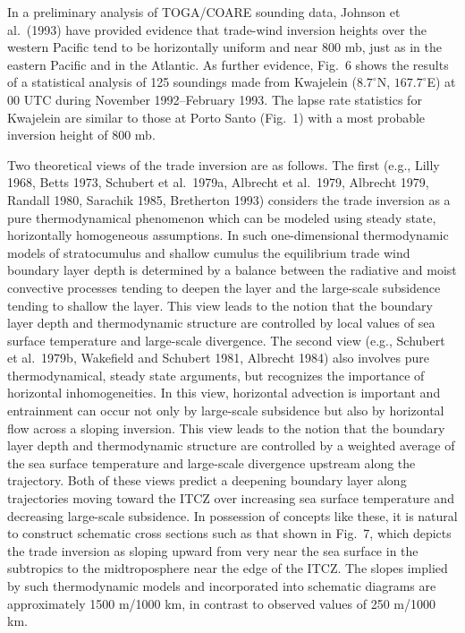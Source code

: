     In a preliminary analysis of TOGA/COARE sounding data, Johnson et
al.~(1993) have provided evidence that trade-wind inversion heights over the
western Pacific tend to be horizontally uniform and near 800 mb, just as in
the eastern Pacific and in the Atlantic.  As further evidence, Fig.~6 shows
the results of a statistical analysis of 125 soundings made from Kwajelein
($8.7^\circ$N, $167.7^\circ$E) at 00 UTC during November 1992--February 1993. 
The lapse rate statistics for Kwajelein are similar to those at Porto Santo
(Fig.~1) with a most probable inversion height of 800 mb.

     Two theoretical views of the trade inversion are as follows.  The first
(e.g., Lilly 1968, Betts 1973, Schubert et al.~1979a, Albrecht et al.\ 1979,
Albrecht 1979, Randall 1980, Sarachik 1985, Bretherton 1993) considers the
trade inversion as a pure thermodynamical phenomenon which can be modeled
using steady state, horizontally homogeneous assumptions. In such
one-dimensional thermodynamic models of stratocumulus and shallow cumulus the
equilibrium trade wind boundary layer depth is determined by a balance between
the radiative and moist convective processes tending to deepen the layer and
the large-scale subsidence tending to shallow the layer. This view leads to
the notion that the boundary layer depth and thermodynamic structure are
controlled by local values of sea surface temperature and large-scale
divergence.  The second view (e.g.,
Schubert et al.~1979b, Wakefield and Schubert 1981, Albrecht 1984) also
involves pure thermodynamical, steady state arguments, but recognizes the
importance of horizontal inhomogeneities.  In this view, horizontal advection
is important and entrainment can occur not only by large-scale subsidence but
also by horizontal flow across a sloping inversion.  This view leads to the
notion that the boundary layer depth and thermodynamic structure are
controlled by a weighted average of the sea surface temperature and
large-scale divergence upstream along the trajectory.  Both of these views 
predict a deepening boundary layer along trajectories moving toward the ITCZ
over increasing sea surface temperature and decreasing large-scale subsidence.
 In possession of concepts like these, it is natural to construct schematic
cross sections such as that shown in Fig.~7, which depicts the trade inversion
as sloping upward from very near the sea surface in the subtropics to the
midtroposphere near the edge of the ITCZ.  The slopes implied by such
thermodynamic models and incorporated into schematic diagrams are
approximately 1500 m/1000 km, in contrast to observed values of 250 m/1000 km.

